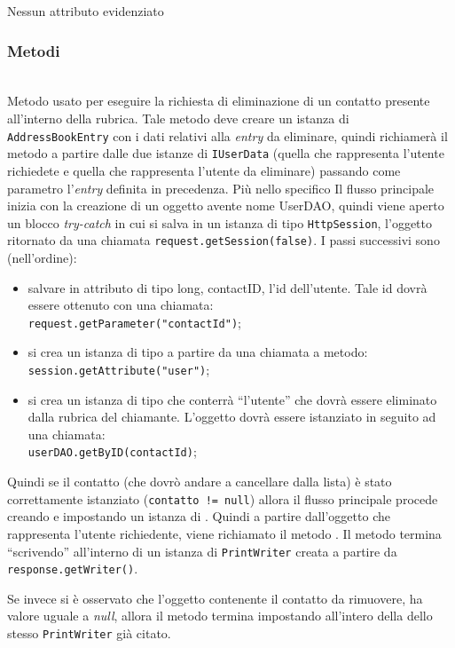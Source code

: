 Nessun attributo evidenziato

\subsubsection*{Metodi}
\begin{description}
	\item{}\\	
	Metodo usato per eseguire la richiesta di eliminazione di un contatto presente all'interno della rubrica. Tale metodo deve creare un istanza di \texttt{AddressBookEntry} con i dati relativi alla \textit{entry} da eliminare, quindi richiamerà il metodo  a partire dalle due istanze di \texttt{IUserData} (quella che rappresenta l'utente richiedete e quella che rappresenta l'utente da eliminare) passando come parametro l'\textit{entry} definita in precedenza. Più nello specifico Il flusso principale inizia  con la creazione di un oggetto  avente nome UserDAO, quindi viene aperto un blocco \textit{try-catch} in cui si salva in un istanza di tipo \texttt{HttpSession}, l'oggetto ritornato da una chiamata \verb|request.getSession(false)|. I passi successivi sono (nell'ordine):
	\begin{itemize}
		\item salvare in attributo di tipo long, contactID, l'id dell'utente. Tale id dovrà essere ottenuto con una chiamata:\\
		\verb|request.getParameter("contactId")|;\\
		
		\item si crea un istanza di tipo  a partire da una chiamata a metodo:\\
		\verb|session.getAttribute("user")|;
		
		\item si crea un istanza di tipo  che conterrà ``l'utente'' che dovrà essere eliminato dalla rubrica del chiamante. L'oggetto dovrà essere istanziato in seguito ad una chiamata:\\
		\verb|userDAO.getByID(contactId)|;
	\end{itemize}
	Quindi se il contatto (che dovrò andare a cancellare dalla lista) è stato correttamente istanziato (\texttt{contatto != null}) allora il flusso principale procede creando e impostando un istanza di . Quindi a partire dall'oggetto che rappresenta l'utente richiedente, viene richiamato il metodo . Il metodo termina ``scrivendo''  all'interno di un istanza di \texttt{PrintWriter} creata a partire da \texttt{response.getWriter()}.
	
	Se invece si è osservato che l'oggetto contenente il contatto da rimuovere, ha valore uguale a \textit{null}, allora il metodo termina impostando  all'intero della dello stesso \texttt{PrintWriter} già citato.
\end{description}

